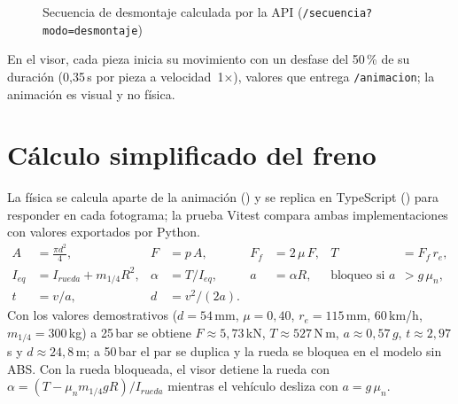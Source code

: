 \begin{figure}[H]\centering
{}
\caption{Secuencia de desmontaje calculada por la API (\texttt{/secuencia?modo=desmontaje})}\label{fig:sim-secuencia}
\end{figure}
En el visor, cada pieza inicia su movimiento con un desfase del 50\,\% de su duración (0,35\,s por pieza a
velocidad~1×), valores que entrega \texttt{/animacion}; la animación es visual y no física.

\section{Cálculo simplificado del freno}
La física se calcula aparte de la animación () y se replica en TypeScript
() para responder en cada fotograma; la prueba Vitest compara ambas
implementaciones con valores exportados por Python.
\begin{align*}
  A &= \tfrac{\pi d^2}{4}, & F &= p\,A, & F_f &= 2\,\mu\,F, & T &= F_f\, r_e,\\
  I_{eq} &= I_{rueda} + m_{1/4} R^2, & \alpha &= T / I_{eq}, & a &= \alpha R, & \text{bloqueo si } a &> g\,\mu_n,\\
  t &= v/a, & d &= v^2/(2a). &&&&
\end{align*}
Con los valores demostrativos ($d = 54$\,mm, $\mu = 0{,}40$, $r_e = 115$\,mm, 60\,km/h, $m_{1/4} = 300$\,kg) a
25\,bar se obtiene $F \approx 5{,}73$\,kN, $T \approx 527$\,N\,m, $a \approx 0{,}57\,g$, $t \approx 2{,}97$\,s y
$d \approx 24{,}8$\,m; a 50\,bar el par se duplica y la rueda se bloquea en el modelo sin ABS. Con la rueda
bloqueada, el visor detiene la rueda con $\alpha = (T - \mu_n m_{1/4} g R)/I_{rueda}$ mientras el vehículo
desliza con $a = g\,\mu_n$.

